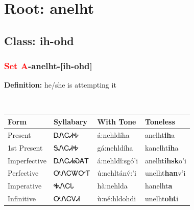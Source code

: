 \needspace{4in}
\section*{Root: anelht}
\nopagebreak
{}
\needspace{3in}
\subsection*{Class: ih-ohd}
\nopagebreak
\needspace{2in}
\subsubsection*{\textcolor{Red}{Set A}{-}\textbf{anelht}{-}[ih-ohd]}
\nopagebreak
\textbf{Definition: } he/she is attempting it
\\[0.5em]
\begin{tabularx}{\textwidth}{l X X X}%
\toprule%
\textbf{Form}&\textbf{Syllabary}&\textbf{With Tone}&\textbf{Toneless}\\%
\midrule%
Present&ᎠᏁᏟᏗᎭ&á:nehldíha&anelht\textbf{ih}a\\%
1st Present&ᎦᏁᏟᏗᎭ&gá:nehldíha&kanelht\textbf{ih}a\\%
Imperfective&ᎠᏁᏟᏗᏍᎪᎢ&á:nehldǐ:sgó’i&anelht\textbf{ihsk}o'i\\%
Perfective&ᎤᏁᏟᏔᏅᎢ&ú:nehltánv́:’i&unelht\textbf{han}v'i\\%
Imperative&ᎭᏁᏟᏓ&hà:nehlda&hanelht\textbf{a}\\%
Infinitive&ᎤᏁᏟᏙᏗ&ù:ně:hldohdi&unelht\textbf{oht}i\\%
\bottomrule%
\end{tabularx}
\\[1em]